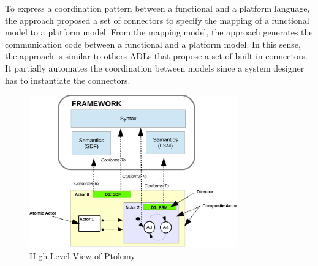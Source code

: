 To express a coordination pattern between a functional and a platform language, the approach proposed a set of connectors to specify the mapping of a functional model to a platform model. From the mapping model, the approach generates the communication code between a functional and a platform model. In this sense, the approach is similar to others ADLs that propose a set of built-in connectors. It partially automates the coordination between models since a system designer has to instantiate the connectors.  

\begin{figure}[ht!]
	\begin{center}
		\includegraphics[width=0.8\textwidth]{background/figs/ptolemyfig}
		\caption{High Level View of Ptolemy~\cite{giraultbib}}
		\label{fig:ptolemyfig}
	\end{center}
\end{figure}

